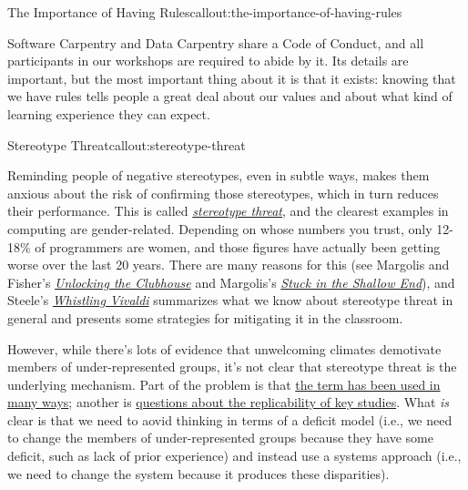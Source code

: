 \begin{callout}{The Importance of Having Rules}{callout:the-importance-of-having-rules}

Software Carpentry and Data Carpentry share a
Code of Conduct, and all
participants in our workshops are required to abide by it. Its details
are important, but the most important thing about it is that it exists:
knowing that we have rules tells people a great deal about our values
and about what kind of learning experience they can expect.
\end{callout}

\begin{callout}{Stereotype Threat}{callout:stereotype-threat}

Reminding people of negative stereotypes, even in subtle ways, makes
them anxious about the risk of confirming those stereotypes, which in
turn reduces their performance. This is called
\emph{\href{https://en.wikipedia.org/wiki/Stereotype\_threat}{stereotype
threat}}, and the clearest examples in computing are gender-related.
Depending on whose numbers you trust, only 12-18\% of programmers are
women, and those figures have actually been getting worse over the last
20 years. There are many reasons for this (see Margolis and Fisher's
\emph{\href{http://www.amazon.com/Unlocking-Clubhouse-Computing-Jane-Margolis/dp/0262632691/}{Unlocking
the Clubhouse}} and Margolis's
\emph{\href{https://www.amazon.com/Stuck-Shallow-End-Education-Computing/dp/0262514044/}{Stuck
in the Shallow End}}), and Steele's
\emph{\href{http://www.amazon.com/dp/0393339726/}{Whistling Vivaldi}}
summarizes what we know about stereotype threat in general and presents
some strategies for mitigating it in the classroom.

However, while there's lots of evidence that unwelcoming climates
demotivate members of under-represented groups, it's not clear that
stereotype threat is the underlying mechanism. Part of the problem is
that
\href{http://www.europhd.net/html/\_onda02/07/PDF/20th\_lab\_materials/jane/shapiro\_neuberg\_2007.pdf}{the
term has been used in many ways}; another is
\href{https://www.psychologytoday.com/blog/rabble-rouser/201512/is-stereotype-threat-overcooked-overstated-and-oversold}{questions
about the replicability of key studies}. What \emph{is} clear is that we
need to aovid thinking in terms of a deficit model (i.e., we need to
change the members of under-represented groups because they have some
deficit, such as lack of prior experience) and instead use a systems
approach (i.e., we need to change the system because it produces these
disparities).
\end{callout}

